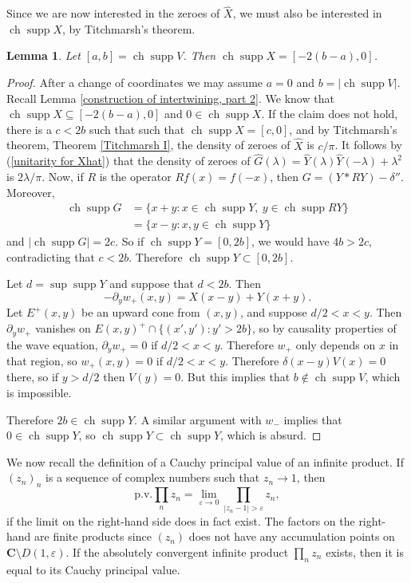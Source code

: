 \documentclass[12pt]{report}
\newcommand{\CC}{\mathbf{C}}
\DeclareMathOperator{\ch}{ch}
\DeclareMathOperator{\supp}{supp}
\newtheorem{lemma}[theorem]{Lemma}
\theoremstyle{definition}
\begin{document}
Since we are now interested in the zeroes of $\hat X$, we must also be interested in $\ch \supp X$, by Titchmarsh's theorem.
\begin{lemma}
\label{computing ch supp X}
Let $[a, b] = \ch \supp V$. Then $\ch \supp X = [-2(b - a), 0]$.
\end{lemma}
\begin{proof}
After a change of coordinates we may assume $a = 0$ and $b = |\ch \supp V|$.
Recall Lemma \ref{construction of intertwining, part 2}.
We know that $\ch \supp X \subseteq [-2(b - a), 0]$ and $0 \in \ch \supp X$.
If the claim does not hold, there is a $c < 2b$ such that such that $\ch \supp X = [c, 0]$, and by Titchmarsh's theorem, Theorem \ref{Titchmarsh I}, the density of zeroes of $\hat X$ is $c/\pi$.
It follows by (\ref{unitarity for Xhat}) that the density of zeroes of $\hat G(\lambda) = \hat Y(\lambda)\hat Y(-\lambda) + \lambda^2$ is $2\lambda/\pi$. Now, if $R$ is the operator $Rf(x) = f(-x)$, then $G = (Y * RY) - \delta''$. Moreover,
\begin{align*}\ch \supp G &= \{x + y: x \in \ch \supp Y, ~y \in \ch \supp RY\} \\
&= \{x - y: x, y \in \ch \supp Y\}
\end{align*}
and $|\ch \supp G| = 2c$. So if $\ch \supp Y = [0, 2b]$, we would have $4b > 2c$, contradicting that $c < 2b$. Therefore $\ch \supp Y \subset [0, 2b]$.

Let $d = \sup \supp Y$ and suppose that $d < 2b$. Then
$$-\partial_y w_+(x, y) = X(x - y) + Y(x + y).$$
Let $E^+(x, y)$ be an upward cone from $(x, y)$, and suppose $d/2 < x < y$. Then $\partial_y w_+$ vanishes on $E(x, y)^+ \cap \{(x', y'): y' > 2b\}$, so by causality properties of the wave equation, $\partial_y w_+ = 0$ if $d/2 < x < y$.
Therefore $w_+$ only depends on $x$ in that region, so $w_+(x, y) = 0$ if $d/2 < x < y$.
Therefore $\delta(x - y)V(x) = 0$ there, so if $y > d/2$ then $V(y) = 0$.
But this implies that $b \notin \ch \supp V$, which is impossible.

Therefore $2b \in \ch \supp Y$. A similar argument with $w_-$ implies that $0 \in \ch \supp Y$, so $\ch \supp Y \subset \ch \supp Y$, which is absurd.
\end{proof}
We now recall the definition of a Cauchy principal value of an infinite product. If $(z_n)_n$ is a sequence of complex numbers such that $z_n \to 1$, then
$$\text{p.v.} \prod_n z_n = \lim_{\varepsilon \to 0} \prod_{|z_n - 1| > \varepsilon} z_n,$$
if the limit on the right-hand side does in fact exist. The factors on the right-hand are finite products since $(z_n)$ does not have any accumulation points on $\CC \setminus D(1, \varepsilon)$. If the absolutely convergent infinite product $\prod_n z_n$ exists, then it is equal to its Cauchy principal value.
\end{document}
